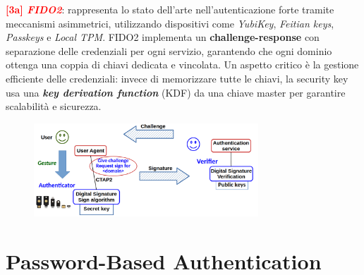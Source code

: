 \begin{flushleft}
    \smallskip

    \textcolor{red}{\textbf{[3a] \textit{FIDO2}}}: rappresenta lo stato dell'arte nell'autenticazione forte tramite meccanismi asimmetrici, utilizzando dispositivi come \textit{YubiKey}, \textit{Feitian keys}, \textit{Passkeys} e \textit{Local TPM}. FIDO2 implementa un \textbf{challenge-response} con separazione delle credenziali per ogni servizio, garantendo che ogni dominio ottenga una coppia di chiavi dedicata e vincolata. Un aspetto critico è la gestione efficiente delle credenziali: invece di memorizzare tutte le chiavi, la security key usa una \textbf{\textit{key derivation function}} (KDF) da una chiave master per garantire scalabilità e sicurezza.

    \begin{figure}[h]
        \centering
        \includegraphics[width=0.75\textwidth]{img/cs_fido.png}
    \end{figure}

\end{flushleft}

\section{Password-Based Authentication}

